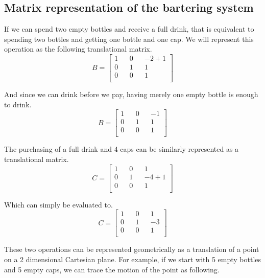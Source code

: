 \documentclass[letterpaper, 12pt]{article}
\begin{document}
\subsection{Matrix representation of the bartering system}
\par If we can spend two empty bottles and receive a full drink, that is equivalent to spending two bottles and getting one bottle and one cap.
We will represent this operation as the following translational matrix.
\[
	B=
	\begin{bmatrix}
		1 && 0 && -2 + 1\\
		0 && 1 &&  1\\
		0 && 0 &&  1\\
	\end{bmatrix}
\]
\par And since we can drink before we pay, having merely one empty bottle is enough to drink.
\[
	B=
	\begin{bmatrix}
		1 && 0 && -1\\
		0 && 1 &&  1\\
		0 && 0 &&  1\\
	\end{bmatrix}
\]
\par The purchasing of a full drink and 4 caps can be similarly represented as a translational matrix.
\[
	C=
	\begin{bmatrix}
		1 && 0 &&  1\\
		0 && 1 && -4 + 1\\
		0 && 0 &&  1\\
	\end{bmatrix}
\]
\par Which can simply be evaluated to.
\[
	C=
	\begin{bmatrix}
		1 && 0 &&  1\\
		0 && 1 && -3\\
		0 && 0 &&  1\\
	\end{bmatrix}
\]
\par These two operations can be represented geometrically as a translation of a point on a 2 dimensional Cartesian plane.
For example, if we start with 5 empty bottles and 5 empty caps, we can trace the motion of the point as following.
\begin{center}
\end{center}
\end{document}
